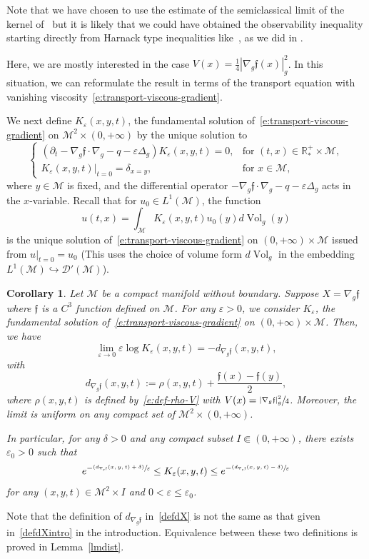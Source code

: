 \documentclass[10pt]{amsart}
\newcommand{\psfrac}[2]{\sfrac{(#1)}{#2}}
\newtheorem{corollary}[lemma]{Corollary}
\theoremstyle{definition}
\newcommand{\M}{\ensuremath{\mathcal M}}
\newcommand{\mb}[1]{\ensuremath{\mathbb{#1}}}
\newcommand{\R}{{\mb{R}}}
\newcommand{\f}{\ensuremath{\mathfrak{f}}}
\DeclareMathOperator{\Vol}{Vol}
\newcommand\nablag{\nabla_{g}}
\let\d\partial
\let\e\varepsilon
\let\eps\varepsilon
\let\q q
\begin{document}
Note that we have chosen to use the estimate of the semiclassical limit of the kernel of~\cite{LY86} but it is likely that we could have obtained the observability inequality starting directly from Harnack type inequalities like~\cite[Th.\,2.1]{LY86}, as we did in \cite{LL:18}.

Here, we are mostly interested in the case $V(x) = \frac14 |\nabla_g \f(x)|_g^2$. In this situation, we can reformulate the result in terms of the transport equation with vanishing viscosity~\eqref{e:transport-viscous-gradient}.

We next define $K_{\e}(x,y,t)$, the fundamental solution of~\eqref{e:transport-viscous-gradient} on $\M^2\times(0,+\infty)$ by the unique solution to
\begin{equation}
\label{e:transport-viscous-kernel}
\begin{cases}
(\d_t - \nablag \f \cdot \nablag -\q - \eps \Delta_g ) K_{\e}(x,y,t)= 0, & \text{for } (t,x) \in \R^+_*\times \M, \\
K_{\e}(x,y,t) |_{t=0} = \delta_{x=y}, & \text{for } x \in \M,
\end{cases}
\end{equation}
where $y \in \M$ is fixed, and the differential operator $- \nablag \f \cdot \nablag -\q - \eps \Delta_g$ acts in the $x$-variable.
Recall that for $u_0 \in L^1(\M)$, the function
\[
u(t,x) = \int_\M K_\eps(x,y,t)u_0(y) d\Vol_g(y)
\]
is the unique solution of~\eqref{e:transport-viscous-gradient} on $(0,+\infty)\times \M$ issued from $u|_{t=0} = u_0$ (This uses the choice of volume form $d\Vol_g$ in the embedding $L^1(\M) \hookrightarrow \mathcal{D}'(\M)$).

\begin{corollary}
\label{corLiYauconj}
Let $\M$ be a compact manifold without boundary. Suppose \hbox{$X\!=\!\nabla_g \f$} where $\f$ is a $C^3$ function defined on $\M$. For any $\e>0$, we consider $K_{\e}$, the fundamental solution of~\eqref{e:transport-viscous-gradient} on $(0,+\infty)\times \M$. Then, we have
\[
\underset{\e\to 0}{\lim}\e \log K_{\e}(x,y, t)=-d_{\nablag \f}(x,y,t),
\]
with
\begin{equation}
\label{defdX}
d_{\nablag \f}(x,y,t) := \rho(x,y,t)+ \frac{\f(x)-\f(y)}{2},
\end{equation}
where $\rho(x,y,t)$ is defined by~\eqref{e:def-rho-V} with $V(x) = \sfrac{|\nabla_g \f|_g^2}{4}$.
Moreover, the limit is uniform on any compact set of $\M^2 \times (0,+\infty)$.

In particular, for any $\delta>0$ and any compact subset $I \Subset (0,+\infty)$, there exists $\e_0>0$ such that
\begin{equation}
\label{inegkernel}
e^{-\psfrac{d_{\nablag \f}(x,y,t)+\delta}{\e}}\leq K_{\e}(x,y,t)\leq e^{-\psfrac{d_{\nablag \f}(x,y,t)-\delta}{\e}}
\end{equation}
for any $(x,y,t)\in \M^2 \times I$ and $0<\e\leq \e_0$.
\end{corollary}
Note that the definition of $d_{\nablag \f}$ in~\eqref{defdX} is not the same as that given in~\eqref{defdXintro} in the introduction. Equivalence between these two definitions is proved in Lemma~\ref{lmdist}.
\end{document}
